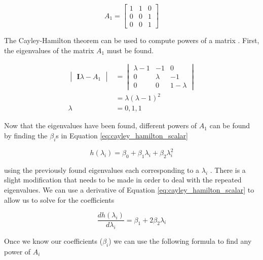 \begin{question}{4} %
\begin{equation}
A_1 = 
\begin{bmatrix} 
  1 & 1 & 0 \\ 
  0 & 0 & 1 \\
  0 & 0 & 1
\end{bmatrix} \nonumber
\end{equation}
\end{question}

The Cayley-Hamilton theorem can be used to compute powers of a matrix 
\cite{chen1998linear}. First, the eigenvalues of the matrix $A_1$ must be found.

\begin{align}
\begin{vmatrix}
{\mathbf{I}\lambda - A_1}
\end{vmatrix} &= 
  \begin{vmatrix}
  \lambda -1 & -1 & 0 \\
  0 & \lambda & -1 \\
  0 & 0 & 1 - \lambda
  \end{vmatrix} \nonumber \\
  &= \lambda (\lambda - 1)^2 \nonumber \\
\lambda &= 0, 1, 1
\end{align}

Now that the eigenvalues have been found, different powers of $A_1$ can be found
by finding the $\beta_i$s in Equation \ref{eq:cayley_hamilton_scalar}

\begin{equation}\label{eq:cayley_hamilton_scalar}
  h(\lambda_i) = \beta_0 + \beta_1 \lambda_i + \beta_2 \lambda_i^2
\end{equation}

\noindent using the previously found eigenvalues each corresponding to a 
$\lambda_i$ . There is a slight modification that needs to be made in order to 
deal with the repeated eigenvalues. We can use a derivative of Equation 
\ref{eq:cayley_hamilton_scalar} to allow us to solve for the coefficients

\begin{equation}
\frac{d h(\lambda_i)}{d\lambda_i} = \beta_1  + 2 \beta_2 \lambda_i
\end{equation}

\noindent Once we know our coefficients ($\beta_i$) we can use the following
formula to find any power of $A_i$

